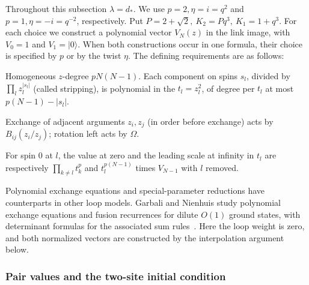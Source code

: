 Throughout this subsection \(\lambda=d_*\). We use \(p=2,\eta=i=q^2\)
and \(p=1,\eta=-i=q^{-2}\), respectively. Put \(P=2+\sqrt2,\ K_2=P q^3,\ K_1=1+q^3\). For each choice we construct a polynomial vector $V_N(z)$ in the link
image, with \(V_0=1\) and \(V_1=|0\rangle\). When both constructions occur
in one formula, their choice is specified by $p$ or by the twist $\eta$.
The defining requirements are as follows:

\par\noindent\textbullet\quad Homogeneous \(z\)-degree \(p N(N-1)\). Each component on spins \(s_l\), divided by \(\prod_l z_l^{|s_l|}\) (called stripping), is polynomial in the \(t_l=z_l^2\), of degree per \(t_l\) at most \(p(N-1)-|s_l|\).
\par\noindent\textbullet\quad Exchange of adjacent arguments \(z_i,z_j\) (in order before exchange) acts by \(B_{ij}(z_i/z_j)\); rotation left acts by \(\Omega\).
\par\noindent\textbullet\quad For spin 0 at \(l\), the value at zero and the leading scale at infinity in \(t_l\) are respectively \(\prod_{k\ne l}t_k^p\) and \(t_l^{p(N-1)}\) times \(V_{N-1}\) with \(l\) removed.

Polynomial exchange equations and special-parameter reductions have
counterparts in other loop models. Garbali and Nienhuis study polynomial
exchange equations and fusion recurrences for dilute $O(1)$ ground states,
with determinant formulas for the associated sum
rules~\cite{GarbaliNienhuis2017Ground,GarbaliNienhuis2017Sum}. Here the loop
weight is zero, and both normalized vectors are constructed by the
interpolation argument below.

\subsubsection{Pair values and the two-site initial condition}


